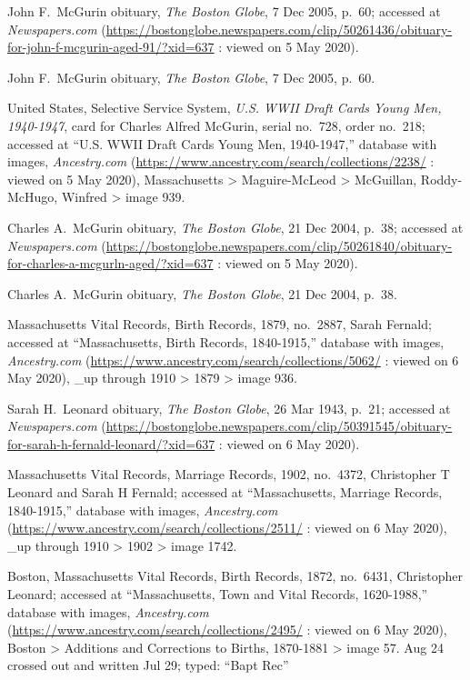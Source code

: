 \begin{thebibliography}{999}
John F.\ McGurin obituary, \textit{The Boston Globe}, 7 Dec 2005, p.\ 60; accessed at \textit{Newspapers.com} (\url{https://bostonglobe.newspapers.com/clip/50261436/obituary-for-john-f-mcgurin-aged-91/?xid=637} : viewed on 5 May 2020).

John F.\ McGurin obituary, \textit{The Boston Globe}, 7 Dec 2005, p.\ 60.

United States, Selective Service System, \textit{U.S. WWII Draft Cards Young Men, 1940-1947}, card for Charles Alfred McGurin, serial no.\ 728, order no.\ 218; accessed at ``U.S. WWII Draft Cards Young Men, 1940-1947,'' database with images, \textit{Ancestry.com} (\url{https://www.ancestry.com/search/collections/2238/} : viewed on 5 May 2020), Massachusetts > Maguire-McLeod > McGuillan, Roddy-McHugo, Winfred > image 939.

Charles A.\ McGurin obituary, \textit{The Boston Globe}, 21 Dec 2004, p.\ 38; accessed at \textit{Newspapers.com} (\url{https://bostonglobe.newspapers.com/clip/50261840/obituary-for-charles-a-mcgurln-aged/?xid=637} : viewed on 5 May 2020).

Charles A.\ McGurin obituary, \textit{The Boston Globe}, 21 Dec 2004, p.\ 38.


Massachusetts Vital Records, Birth Records, 1879, no.\ 2887, Sarah Fernald; accessed at ``Massachusetts, Birth Records, 1840-1915,'' database with images, \textit{Ancestry.com} (\url{https://www.ancestry.com/search/collections/5062/} : viewed on 6 May 2020), \_up through 1910 > 1879 > image 936.

Sarah H.\ Leonard obituary, \textit{The Boston Globe}, 26 Mar 1943, p.\ 21; accessed at \textit{Newspapers.com} (\url{https://bostonglobe.newspapers.com/clip/50391545/obituary-for-sarah-h-fernald-leonard/?xid=637} : viewed on 6 May 2020).

Massachusetts Vital Records, Marriage Records, 1902, no.\ 4372, Christopher T Leonard and Sarah H Fernald; accessed at ``Massachusetts, Marriage Records, 1840-1915,'' database with images, \textit{Ancestry.com} (\url{https://www.ancestry.com/search/collections/2511/} : viewed on 6 May 2020), \_up through 1910 > 1902 > image 1742.

Boston, Massachusetts Vital Records, Birth Records, 1872, no.\ 6431, Christopher Leonard; accessed at ``Massachusetts, Town and Vital Records, 1620-1988,'' database with images, \textit{Ancestry.com} (\url{https://www.ancestry.com/search/collections/2495/} : viewed on 6 May 2020), Boston > Additions and Corrections to Births, 1870-1881 > image 57. Aug 24 crossed out and written Jul 29; typed: ``Bapt Rec''


\end{thebibliography}
